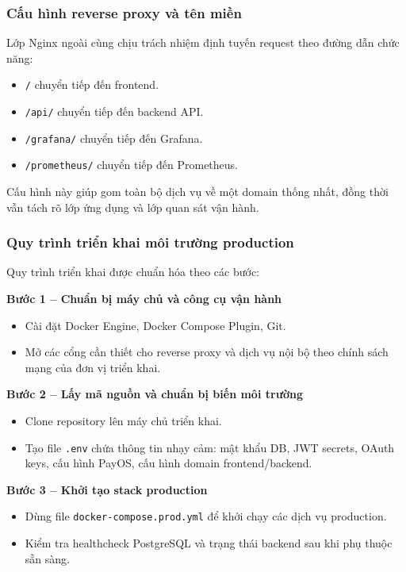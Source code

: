 \subsubsection{Cấu hình reverse proxy và tên miền}
Lớp Nginx ngoài cùng chịu trách nhiệm định tuyến request theo đường dẫn chức năng:
\begin{itemize}
	\item \texttt{/} chuyển tiếp đến frontend.
	\item \texttt{/api/} chuyển tiếp đến backend API.
	\item \texttt{/grafana/} chuyển tiếp đến Grafana.
	\item \texttt{/prometheus/} chuyển tiếp đến Prometheus.
\end{itemize}

Cấu hình này giúp gom toàn bộ dịch vụ về một domain thống nhất, đồng thời vẫn tách rõ lớp ứng dụng và lớp quan sát vận hành.

\subsubsection{Quy trình triển khai môi trường production}
Quy trình triển khai được chuẩn hóa theo các bước:

\textbf{Bước 1 -- Chuẩn bị máy chủ và công cụ vận hành}
\begin{itemize}
	\item Cài đặt Docker Engine, Docker Compose Plugin, Git.
	\item Mở các cổng cần thiết cho reverse proxy và dịch vụ nội bộ theo chính sách mạng của đơn vị triển khai.
\end{itemize}

\textbf{Bước 2 -- Lấy mã nguồn và chuẩn bị biến môi trường}
\begin{itemize}
	\item Clone repository lên máy chủ triển khai.
	\item Tạo file \texttt{.env} chứa thông tin nhạy cảm: mật khẩu DB, JWT secrets, OAuth keys, cấu hình PayOS, cấu hình domain frontend/backend.
\end{itemize}

\textbf{Bước 3 -- Khởi tạo stack production}
\begin{itemize}
	\item Dùng file \texttt{docker-compose.prod.yml} để khởi chạy các dịch vụ production.
	\item Kiểm tra healthcheck PostgreSQL và trạng thái backend sau khi phụ thuộc sẵn sàng.
\end{itemize}

